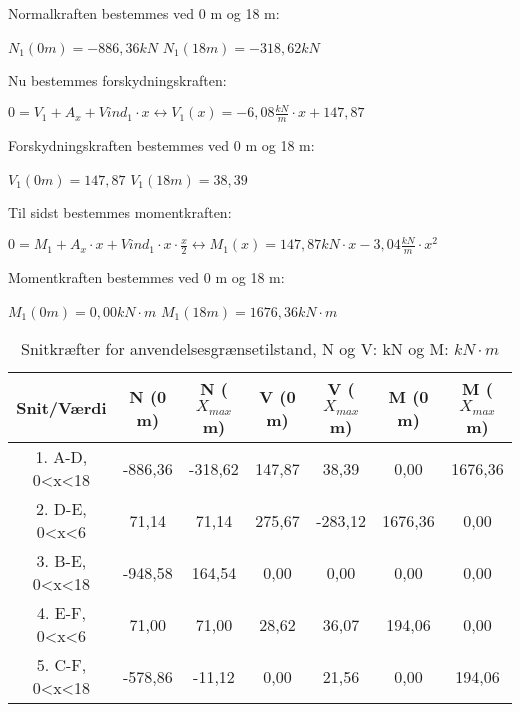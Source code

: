 Normalkraften bestemmes ved 0 m og 18 m:
\begin{center}
	$N_1(0m) = -886,\!36 kN$
	\newline
	$N_1(18m) = -318,\!62 kN$
\end{center}

Nu bestemmes forskydningskraften:
\begin{center}
	$0 = V_1 + A_x + Vind_1 \cdot x \leftrightarrow V_1(x) = -6,\!08 \frac{kN}{m} \cdot x + 147,\!87$
\end{center}

Forskydningskraften bestemmes ved 0 m og 18 m:
\begin{center}
	$V_1(0m) = 147,\!87$
	\newline
	$V_1(18m) = 38,\!39$
\end{center}

Til sidst bestemmes momentkraften:
\begin{center}
	$0 = M_1 + A_x \cdot x + Vind_1\cdot x\cdot \frac{x}{2} \leftrightarrow M_1(x) = 147,\!87 kN\cdot x - 3,\!04 \frac{kN}{m}\cdot x^2$
\end{center}

Momentkraften bestemmes ved 0 m og 18 m:
\begin{center}
	$M_1(0m) = 0,\!00 kN\cdot m$
	\newline
	$M_1(18m) = 1676,\!36 kN\cdot m$
\end{center}

\begin{table}
	\begin{center}
		\begin{tabular}{|c|c|c|c|c|c|c|}
			\hline
			Snit/Værdi    & N (0 m) & N ($X_{max}$ m) & V (0 m) & V ($X_{max}$ m) & M (0 m) & M ($X_{max}$ m) 	\\ \hline
			1. A-D, 0<x<18 	& -886,36 	& -318,62 	&  147,87 	&  38,39 	&  0,00     &  1676,36        		\\ \hline
			2. D-E, 0<x<6  	&  71,14    &  71,14    &  275,67   & -283,12   &  1676,36  &  0,00    \\ \hline
			3. B-E, 0<x<18  & -948,58   &  164,54   &  0,00     &  0,00     &  0,00     &  0,00 			    \\ \hline
			4. E-F, 0<x<6   &  71,00    &  71,00    &  28,62    &  36,07    &  194,06   &  0,00     \\ \hline
			5. C-F, 0<x<18     & -578,86   & -11,12    &  0,00     &  21,56    &  0,00     &  194,06       		\\ \hline
		\end{tabular}
		\caption{Snitkræfter for anvendelsesgrænsetilstand, N og V: kN og M: $kN\cdot m$}
		\label{tab:anden2}
	\end{center}
\end{table}